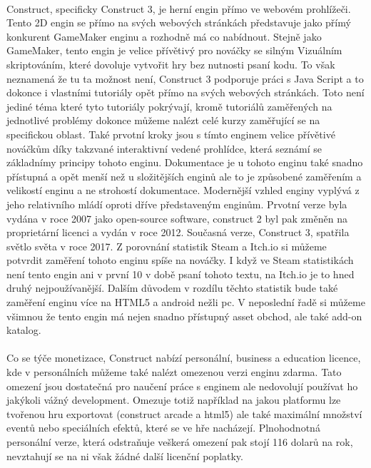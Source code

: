 \paragraph{}
	Construct, specificky Construct 3, je herní engin přímo ve webovém prohlížeči.
	Tento 2D engin se přímo na svých webových stránkách\cite{construct_3_mainpage} představuje jako přímý konkurent GameMaker enginu a rozhodně má co nabídnout.
	Stejně jako GameMaker, tento engin je velice přívětivý pro nováčky se silným Vizuálním skriptováním, které dovoluje vytvořit hry bez nutnosti psaní kodu.
	To však neznamená že tu ta možnost není, Construct 3 podporuje práci s Java Script a to dokonce i vlastními tutoriály\cite{construct_3_tutorials} opět přímo na svých webových stránkách.
	Toto není jediné téma které tyto tutoriály pokrývají, kromě tutoriálů zaměřených na jednotlivé problémy dokonce můžeme nalézt celé kurzy zaměřující se na specifickou oblast.
	Také prvotní kroky jsou s tímto enginem velice přívětivé nováčkům díky takzvané interaktivní vedené prohlídce\cite{construct_3_interactive_quided_tour}, která seznámí se základnímy principy tohoto enginu.
	Dokumentace\cite{construct_3_documentation} je u tohoto enginu také snadno přístupná a opět menší než u složitějších enginů ale to je způsobené zaměřením a velikostí enginu a ne strohostí dokumentace.
	Modernější vzhled enginy vyplývá z jeho relativního mládí oproti dříve představeným enginům.
	Prvotní verze byla vydána v roce 2007 jako open-source software,  construct 2 byl pak změněn na proprietární licenci a vydán v roce 2012.
	Současná verze, Construct 3, spatřila světlo světa v roce 2017.
	Z porovnání statistik Steam\cite{steamdb_engines} a Itch.io\cite{itch_io_engines} si můžeme potvrdit zaměření tohoto enginu spíše na nováčky.
	I když ve Steam statistikách není tento engin ani v první 10 v době psaní tohoto textu, na Itch.io je to hned druhý nejpoužívanější.
	Dalším důvodem v rozdílu těchto statistik bude také zaměření enginu více na HTML5 a android nežli pc.
	V neposlední řadě si můžeme všimnou že tento engin má nejen snadno přístupný asset obchod, ale také add-on katalog.

\paragraph{}
	Co se týče monetizace\cite{construct_3_personal_plans}, Construct nabízí personální, business a education licence, kde v personálních můžeme také nalézt omezenou verzi enginu zdarma.
	Tato omezení jsou dostatečná pro naučení práce s enginem ale nedovolují používat ho jakýkoli vážný development.
	Omezuje totiž například na jakou platformu lze tvořenou hru exportovat (construct arcade a html5) ale také maximální množství eventů nebo speciálních efektů, které se ve hře nacházejí.
	Plnohodnotná personální verze, která odstraňuje veškerá omezení pak stojí 116 dolarů na rok, nevztahují se na ni však žádné další licenční poplatky.

